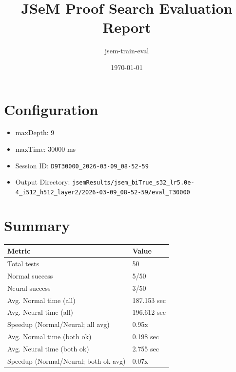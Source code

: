 \documentclass[a4paper,10pt]{article}
\title{JSeM Proof Search Evaluation Report}
\author{jsem-train-eval}
\date{\today}
\begin{document}
\maketitle

\section{Configuration}
\begin{itemize}
\item maxDepth: 9
\item maxTime: 30000 ms
\item Session ID: \texttt{D9T30000\_2026-03-09\_08-52-59}
\item Output Directory: \texttt{jsemResults/jsem\_biTrue\_s32\_lr5.0e-4\_i512\_h512\_layer2/2026-03-09\_08-52-59/eval\_T30000}
\end{itemize}

\section{Summary}
\begin{tabular}{ll}
\toprule
\textbf{Metric} & \textbf{Value} \\
\midrule
Total tests & 50 \\
Normal success & 5/50 \\
Neural success & 3/50 \\
\midrule
Avg. Normal time (all) & 187.153 sec \\
Avg. Neural time (all) & 196.612 sec \\
Speedup (Normal/Neural; all avg) & 0.95x \\
Avg. Normal time (both ok) & 0.198 sec \\
Avg. Neural time (both ok) & 2.755 sec \\
Speedup (Normal/Neural; both ok avg) & 0.07x \\
\bottomrule
\end{tabular}
\end{document}
